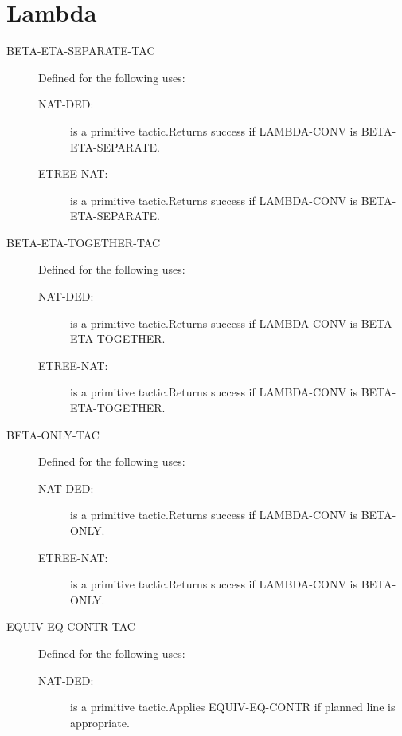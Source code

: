 \section{Lambda}

\begin{description} 
\item[BETA-ETA-SEPARATE-TAC]  Defined for the following uses:
\begin{description}
\item[NAT-DED:]  is a primitive tactic.Returns success if LAMBDA-CONV is BETA-ETA-SEPARATE.

\item[ETREE-NAT:]  is a primitive tactic.Returns success if LAMBDA-CONV is BETA-ETA-SEPARATE.

\end{description}

\item[BETA-ETA-TOGETHER-TAC]  Defined for the following uses:
\begin{description}
\item[NAT-DED:]  is a primitive tactic.Returns success if LAMBDA-CONV is BETA-ETA-TOGETHER.

\item[ETREE-NAT:]  is a primitive tactic.Returns success if LAMBDA-CONV is BETA-ETA-TOGETHER.

\end{description}

\item[BETA-ONLY-TAC]  Defined for the following uses:
\begin{description}
\item[NAT-DED:]  is a primitive tactic.Returns success if LAMBDA-CONV is BETA-ONLY.

\item[ETREE-NAT:]  is a primitive tactic.Returns success if LAMBDA-CONV is BETA-ONLY.

\end{description}

\item[EQUIV-EQ-CONTR-TAC]  Defined for the following uses:
\begin{description}
\item[NAT-DED:]  is a primitive tactic.Applies EQUIV-EQ-CONTR if planned line is appropriate.


\end{description}
\end{description}
